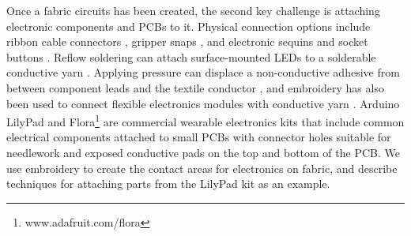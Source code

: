 Once a fabric circuits has been created, the second key challenge is attaching electronic components and PCBs to it.
Physical connection options include ribbon cable connectors \cite{lehn2004tags}, gripper snaps \cite{5387040}, and electronic sequins and socket buttons \cite{Buechley2009}. Reflow soldering can attach surface-mounted LEDs to a solderable conductive yarn \cite{Berglund:2015:SCA:2802083.2808413, Molla:2017:SME:3123021.3123058}. Applying pressure can displace a non-conductive adhesive from between component leads and the textile conductor \cite{linz2012contacting}, and embroidery has also been used to connect flexible electronics modules with conductive yarn \cite{linz2005embroidering}. Arduino LilyPad \cite{4487082} and Flora\footnote{www.adafruit.com/flora} are commercial wearable electronics kits that include common electrical components attached to small PCBs with connector holes suitable for needlework and exposed conductive pads on the top and bottom of the PCB. We use embroidery to create the contact areas for electronics on fabric, and describe techniques for attaching parts from the LilyPad kit as an example.


